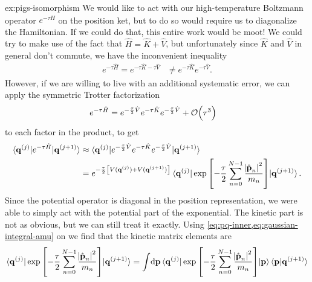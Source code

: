 \begin{DefAnswer}{ex:pigs-isomorphism}
	We would like to act with our high-temperature Boltzmann operator $e^{-\tau \hat{H}}$ on the position ket, but to do so would require us to diagonalize the Hamiltonian.
	If we could do that, this entire work would be moot!
	We could try to make use of the fact that $\hat{H} = \hat{K} + \hat{V}$, but unfortunately since $\hat{K}$ and $\hat{V}$ in general don't commute, we have the inconvenient inequality
	\begin{align}
		e^{-\tau \hat{H}}
		= e^{-\tau \hat{K} - \tau \hat{V}}
		&\ne e^{-\tau \hat{K}} e^{-\tau \hat{V}}.
	\end{align}
	However, if we are willing to live with an additional systematic error, we can apply the symmetric Trotter factorization~\cite{schmidt1995high}
	\begin{align}
		e^{-\tau \hat{H}}
		&= e^{-\frac{\tau}{2} \hat{V}} e^{-\tau \hat{K}} e^{-\frac{\tau}{2} \hat{V}} + \mathcal{O}\!\left( \tau^3 \right)
	\end{align}
	to each factor in the product, to get
	\begin{subequations}
	\begin{align}
		\braket{\bm{\mathbf{q}}^{(j)} | e^{-\tau \hat{H}} | \bm{\mathbf{q}}^{(j+1)}}
		&\approx \braket{
			\bm{\mathbf{q}}^{(j)} |
			e^{-\frac{\tau}{2} \hat{V}} e^{-\tau \hat{K}} e^{-\frac{\tau}{2} \hat{V}} |
			\bm{\mathbf{q}}^{(j+1)}
		} \\
		&= e^{-\frac{\tau}{2} \left[ V(\bm{\mathbf{q}}^{(j)}) + V(\bm{\mathbf{q}}^{(j+1)}) \right]}
			\braket{
				\bm{\mathbf{q}}^{(j)} |
				\exp{\left[ -\frac{\tau}{2} \sum_{n=0}^{N-1} \frac{\abs{\hat{\bm{\mathbf{p}}}_n}^2}{m_n} \right]} |
				\bm{\mathbf{q}}^{(j+1)}
			}.
	\end{align}
	\end{subequations}
	Since the potential operator is diagonal in the position representation, we were able to simply act with the potential part of the exponential.
	The kinetic part is not as obvious, but we can still treat it exactly.
	Using \cref{eq:pq-inner,eq:gaussian-integral-amu} on  we find that the kinetic matrix elements are
	\begin{subequations}
	\begin{align}
		\braket{
			\vec{q}\bead{j} |
			\expb{-\frac{\tau}{2} \sum_{n=0}^{N-1} \frac{\abs{\hat{\vec{p}}_n}^2}{m_n}} |
			\vec{q}\bead{j+1}
		}
		&= \int\! \dif \vec{p}
				\braket{
					\vec{q}\bead{j} |
					\expb{-\frac{\tau}{2} \sum_{n=0}^{N-1} \frac{\abs{\hat{\vec{p}}_n}^2}{m_n}} |
					\vec{p}
				}
				\braket{\vec{p} | \vec{q}\bead{j+1}} \\

\end{align}
\end{subequations}
\end{DefAnswer}
